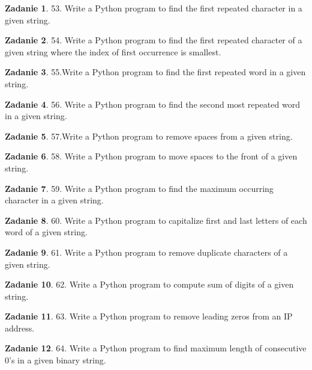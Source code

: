 \documentclass[11pt]{article}
\theoremstyle{definition}
\newtheorem{zadanie}{Zadanie}
\begin{document}
\begin{zadanie}
53. Write a Python program to find the first repeated character in a given string.
\end{zadanie}

\begin{zadanie}
54. Write a Python program to find the first repeated character of a given string where the index of first occurrence is smallest.
\end{zadanie}

\begin{zadanie}
55.Write a Python program to find the first repeated word in a given string.
\end{zadanie}

\begin{zadanie}
56. Write a Python program to find the second most repeated word in a given string.
\end{zadanie}

\begin{zadanie}
57.Write a Python program to remove spaces from a given string.
\end{zadanie}

\begin{zadanie}
58. Write a Python program to move spaces to the front of a given string.
\end{zadanie}

\begin{zadanie}
59. Write a Python program to find the maximum occurring character in a given string.
\end{zadanie}

\begin{zadanie}
60. Write a Python program to capitalize first and last letters of each word of a given string.
\end{zadanie}

\begin{zadanie}
61. Write a Python program to remove duplicate characters of a given string.
\end{zadanie}

\begin{zadanie}
62. Write a Python program to compute sum of digits of a given string.
\end{zadanie}

\begin{zadanie}
63. Write a Python program to remove leading zeros from an IP address.
\end{zadanie}

\begin{zadanie}
64. Write a Python program to find maximum length of consecutive 0's in a given binary string.
\end{zadanie}
\end{document}
